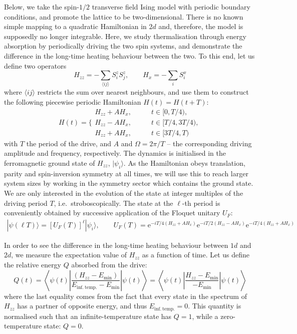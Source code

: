 \documentclass{SciPost}
\newcommand\0{\scalebox{-1}[1]{0}}
\begin{document}
Below, we take the spin-$1/2$ transverse field Ising model with periodic boundary conditions, and promote the lattice to be two-dimensional. There is no known simple mapping to a quadratic Hamiltonian in $2d$ and, therefore, the model is supposedly no longer integrable. Here, we study thermalisation through energy absorption by periodically driving the two spin systems, and demonstrate the difference in the long-time heating behaviour between the two. To this end, let us define two operators
\begin{equation}
H_{zz} = -\sum_{\langle ij\rangle} S^z_iS^z_{j}, \qquad H_{x} = -\sum_{i}S^x_i
\end{equation}
where $\langle ij\rangle$ restricts the sum over nearest neighbours, and use them to construct the following piecewise periodic Hamiltonian $H(t)=H(t+T)$:
\begin{equation}
H(t)=\Bigg\{ \begin{array}{cc}
H_{zz} +AH_x,& \qquad t\in[0,T/4), \\
H_{zz} -AH_x,& \qquad t\in[T/4,3T/4),\\
H_{zz} +AH_x,& \qquad t\in[3T/4,T)
\end{array}
\end{equation}
with $T$ the period of the drive, and $A$ and $\Omega=2\pi/T$ -- the corresponding driving amplitude and frequency, respectively. The dynamics is initialised in the ferromagnetic ground state of $H_{zz}$, $|\psi_i\rangle$. As the Hamiltonian obeys translation, parity and spin-inversion symmetry at all times, we will use this to reach larger system sizes by working in the symmetry sector which contains the ground state. We are only interested in the evolution of the state at integer multiples of the driving period $T$, i.e.~stroboscopically. The state at the $\ell$-th period is conveniently obtained by successive application of the Floquet unitary $U_F$:
\begin{eqnarray}
|\psi(\ell T)\rangle = [U_F(T)]^\ell|\psi_i\rangle, \qquad U_F(T)=\mathrm e^{-iT/4(H_{zz} +AH_x)}
\mathrm e^{-iT/2(H_{zz} -AH_x)}\mathrm e^{-iT/4(H_{zz} +AH_x)}
\end{eqnarray} 

In order to see the difference in the long-time heating behaviour between $1d$ and $2d$, we measure the expectation value of $H_{zz}$ as a function of time. Let us define the relative energy $Q$ absorbed from the drive:
\begin{equation}
Q(t) =\left\langle\psi(t)\left\vert\frac{ \left(H_{zz}-E_\mathrm{min}\right)}{E_\mathrm{inf.~temp.}-E_\mathrm{min}}\right\vert\psi(t)\right\rangle=\left\langle\psi(t)\left\vert\frac{ H_{zz}-E_\mathrm{min}}{-E_\mathrm{min}}\right\vert\psi(t)\right\rangle
\end{equation}
where the last equality comes from the fact that every state in the spectrum of $H_{zz}$ has a partner of opposite energy, and thus $E_\mathrm{inf.~temp.}=0$. This quantity is normalised such that an infinite-temperature state has $Q=1$, while a zero-temperature state: $Q=0$. 
\end{document}
